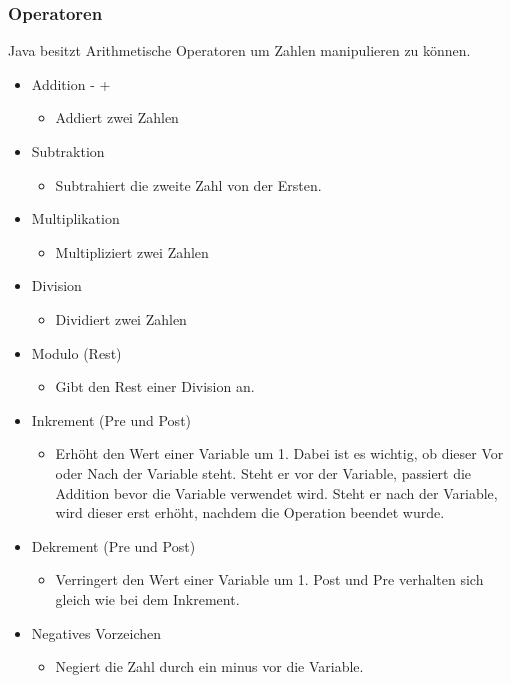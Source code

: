 \documentclass{article}
\begin{document}
	\subsubsection{Operatoren}
	Java besitzt Arithmetische Operatoren um Zahlen manipulieren zu können. \\
	\begin{itemize}
		\item{Addition - +}
		\begin{itemize}
			\item{Addiert zwei Zahlen}
		\end{itemize}
		\item{Subtraktion}
		\begin{itemize}
			\item{Subtrahiert die zweite Zahl von der Ersten.}
		\end{itemize}
		\item{Multiplikation}
		\begin{itemize}
			\item{Multipliziert zwei Zahlen}
		\end{itemize}
		\item{Division}
		\begin{itemize}
			\item{Dividiert zwei Zahlen}
		\end{itemize}
		\item{Modulo (Rest)}
		\begin{itemize}
			\item{Gibt den Rest einer Division an.}
		\end{itemize}
		\item{Inkrement (Pre und Post)}
		\begin{itemize}
			\item{Erhöht den Wert einer Variable um 1. Dabei ist es wichtig, ob dieser Vor oder Nach der Variable steht. Steht er vor der Variable, passiert die Addition bevor die Variable verwendet wird. Steht er nach der Variable, wird dieser erst erhöht, nachdem die Operation beendet wurde.}
		\end{itemize}
		\item{Dekrement (Pre und Post)}
		\begin{itemize}
			\item{Verringert den Wert einer Variable um 1. Post und Pre verhalten sich gleich wie bei dem Inkrement.}
		\end{itemize}
		\item{Negatives Vorzeichen}
		\begin{itemize}
			\item{Negiert die Zahl durch ein minus vor die Variable.}
		\end{itemize}
	\end{itemize}
\end{document}
